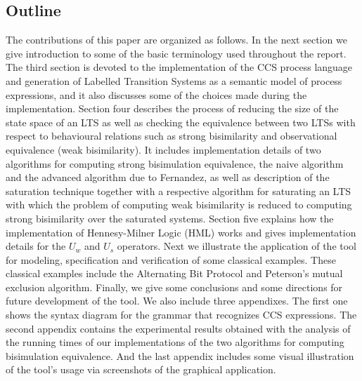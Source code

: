 \subsection{Outline} The contributions of this paper are organized as follows. In the next section we give introduction to some of the basic terminology used throughout the report. The third section is devoted to the implementation of the CCS process language and generation of Labelled Transition Systems as a semantic model of process expressions, and it also discusses some of the choices made during the implementation. Section four describes the process of reducing the size of the state space of an LTS as well as checking the equivalence between two LTSs with respect to behavioural relations such as strong bisimilarity and observational equivalence (weak bisimilarity). It includes implementation details of two algorithms for computing strong bisimulation equivalence, the naive algorithm and the advanced algorithm due to Fernandez, as well as description of the saturation technique together with a respective algorithm  for saturating an LTS with which the problem of computing weak bisimilarity is reduced to computing strong bisimilarity over the saturated systems. Section five explains how the implementation of Hennesy-Milner Logic (HML) works and gives implementation details for the $U_{w}$ and $U_{s}$ operators. Next we illustrate the application of the tool for modeling, specification and verification of some classical examples. These classical examples include the Alternating Bit Protocol and Peterson's mutual exclusion algorithm. Finally, we give some conclusions and some directions for future development of the tool. We also include three appendixes. The first one shows the syntax diagram for the grammar that recognizes CCS expressions. The second appendix contains the experimental results obtained with the analysis of the running times of our implementations of the two algorithms for computing bisimulation equivalence. And the last appendix includes some visual illustration of the tool's usage via screenshots of the graphical application.

